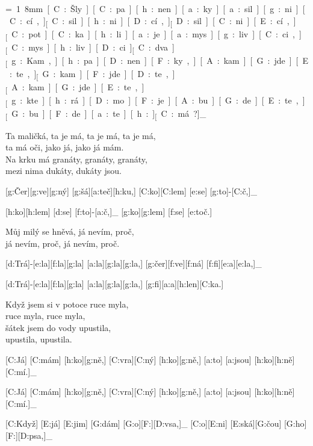 
{\unit=1.8mm
[C:Šly] [C:pa][h:nen][a:ky] [a:sil][g:ni][C:cí,]_
[C:sil][h:ni][D:cí,]_ [D:sil][C:ni][E:cí,]_

[C:pot][C:ka][h:li] [a:je] [a:mys][g:liv][C:ci,]_
[C:mys][h:liv][D:ci]_ [C:dva.]_

[g:Kam,] [h:pa][D:nen][F:ky,] [A:kam] [G:jde][E:te,]_
[G:kam] [F:jde][D:te,]_ [A:kam] [G:jde][E:te,]_

[g:kte][h:rá] [D:mo][F:je] [A:bu][G:de][E:te,]_
[G:bu][F:de][a:te][h:]_ [C:má?]_
}

Ta maličká, ta je má, ta je má, ta je má,\\
ta má oči, jako já, jako já mám.\\
Na krku má granáty, granáty, granáty,\\
mezi nima dukáty, dukáty jsou.




[g:Čer][g:ve][g:ný] [g:šá][a:teč][h:ku,] [C:ko][C:lem] [e:se] [g:to]-[C:č,]_

[h:ko][h:lem] [d:se] [f:to]-[a:č,]_ [g:ko][g:lem] [f:se] [e:toč.]

Můj milý se hněvá, já nevím, proč,\\
já nevím, proč, já nevím, proč.

[d:Trá]-[e:la][f:la][g:la] [a:la][g:la][g:la,] %
[g:čer][f:ve][f:ná] [f:fi][e:a][e:la,]_

[d:Trá]-[e:la][f:la][g:la] [a:la][g:la][g:la,] [g:fi][a:a][h:len][C:ka.] %

Když jsem si v potoce ruce myla,\\
ruce myla, ruce myla,\\
šátek jsem do vody upustila,\\
upustila, upustila.



[C:Já] [C:mám] [h:ko][g:ně,] [C:vra][C:ný] [h:ko][g:ně,] %
[a:to] [a:jsou] [h:ko][h:ně] [C:mí.]_

[C:Já] [C:mám] [h:ko][g:ně,] [C:vra][C:ný] [h:ko][g:ně,] %
[a:to] [a:jsou] [h:ko][h:ně] [C:mí.]_

[C:Když] [E:já] [E:jim] [G:dám] [G:o][F:][D:vsa,]_
[C:o][E:ni] [E:ská][G:čou] [G:ho][F:][D:psa,]_

